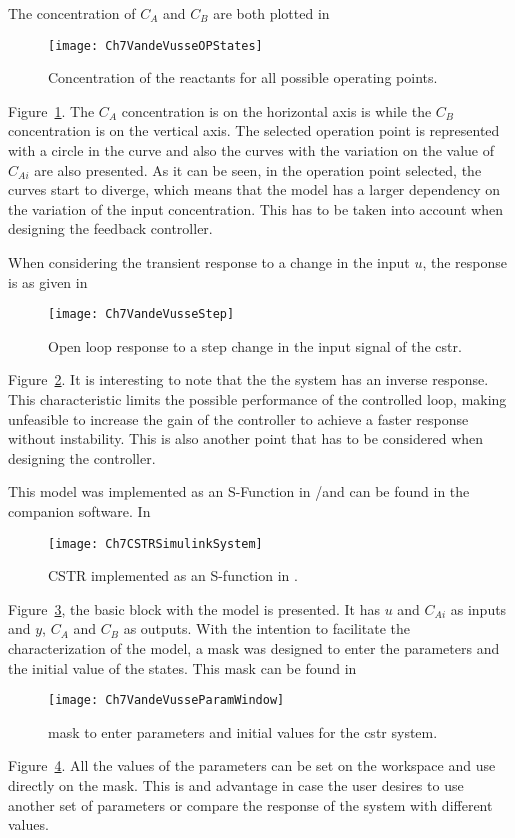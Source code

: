 The concentration of $C_A$ and $C_B$ are both plotted in %
\begin{figure}
	\centering
	\texttt{[image: Ch7VandeVusseOPStates]}
	\caption{Concentration of the reactants for all possible operating points.}
	\label{fig:Ch7VandeVusseOPStates}
\end{figure}
%
Figure~\ref{fig:Ch7VandeVusseOPStates}. The $C_A$ concentration is on the horizontal axis is while the $C_B$ concentration is on the vertical axis. The selected operation point is represented with a circle in the curve and also the curves with the variation on the value of $C_{Ai}$ are also presented. As it can be seen, in the operation point selected, the curves start to diverge, which means that the model has a larger dependency on the variation of the input concentration. This has to be taken into account when designing the feedback controller.

When considering the transient response to a change in the input $u$, the response is as given in %
\begin{figure}
	\centering
	\texttt{[image: Ch7VandeVusseStep]}
	\caption{Open loop response to a step change in the input signal of the \gls{cstr}.}
	\label{fig:Ch7VandeVusseStep}
\end{figure}
%
Figure~\ref{fig:Ch7VandeVusseStep}. It is interesting to note that the the system has an inverse response. This characteristic limits the possible performance of the controlled loop, making unfeasible to increase the gain of the controller to achieve a faster response without instability. This is also another point that has to be considered when designing the controller.

This model was implemented as an S-Function in \matlab/\simulink and can be found in the companion software. In %
\begin{figure}[tb]
	\centering
	\texttt{[image: Ch7CSTRSimulinkSystem]}
	\caption{CSTR implemented as an S-function in \simulink.}
	\label{fig:Ch7CSTRSimulinkSystem}
\end{figure}
%
Figure~\ref{fig:Ch7CSTRSimulinkSystem}, the basic block with the model is presented. It has $u$ and $C_{Ai}$ as inputs and $y$, $C_A$ and $C_B$ as outputs. With the intention to facilitate the characterization of the model, a mask was designed to enter the parameters and the initial value of the states. This mask can be found in %
\begin{figure}[tb]
	\centering
	\texttt{[image: Ch7VandeVusseParamWindow]}
	\caption{\simulink mask to enter parameters and initial values for the \gls{cstr} system.}
	\label{fig:Ch7VandeVusseParamWindow}
\end{figure}  
Figure~\ref{fig:Ch7VandeVusseParamWindow}. All the values of the parameters can be set on the \matlab{} workspace and use directly on the mask. This is and advantage in case the user desires to use another set of parameters or compare the response of the system with different values.


